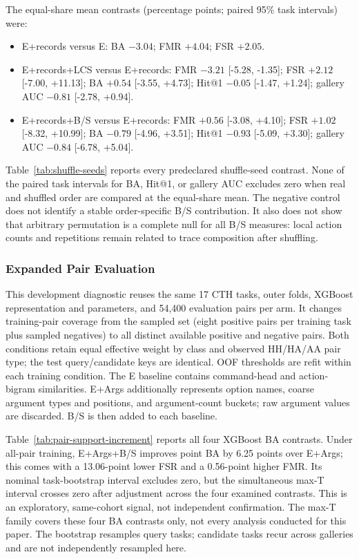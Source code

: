 \documentclass[10pt]{article}
\begin{document}
The equal-share mean contrasts (percentage points; paired 95\% task intervals) were:

\begin{itemize}
\item E+records versus E: BA $-3.04$; FMR $+4.04$; FSR $+2.05$.
\item E+records+LCS versus E+records: FMR $-3.21$ [-5.28, -1.35]; FSR $+2.12$ [-7.00, +11.13]; BA $+0.54$ [-3.55, +4.73]; Hit@1 $-0.05$ [-1.47, +1.24]; gallery AUC $-0.81$ [-2.78, +0.94].
\item E+records+B/S versus E+records: FMR $+0.56$ [-3.08, +4.10]; FSR $+1.02$ [-8.32, +10.99]; BA $-0.79$ [-4.96, +3.51]; Hit@1 $-0.93$ [-5.09, +3.30]; gallery AUC $-0.84$ [-6.78, +5.04].
\end{itemize}

Table~\ref{tab:shuffle-seeds} reports every predeclared shuffle-seed contrast. None of the paired task intervals for BA, Hit@1, or gallery AUC excludes zero when real and shuffled order are compared at the equal-share mean. The negative control does not identify a stable order-specific B/S contribution. It also does not show that arbitrary permutation is a complete null for all B/S measures: local action counts and repetitions remain related to trace composition after shuffling.

\subsubsection{Expanded Pair Evaluation}
\label{sec:pairsupport}
This development diagnostic reuses the same 17 CTH tasks, outer folds, XGBoost representation and parameters, and 54,400 evaluation pairs per arm. It changes training-pair coverage from the sampled set (eight positive pairs per training task plus sampled negatives) to all distinct available positive and negative pairs. Both conditions retain equal effective weight by class and observed HH/HA/AA pair type; the test query/candidate keys are identical. OOF thresholds are refit within each training condition. The E baseline contains command-head and action-bigram similarities. E+Args additionally represents option names, coarse argument types and positions, and argument-count buckets; raw argument values are discarded. B/S is then added to each baseline.

Table~\ref{tab:pair-support-increment} reports all four XGBoost BA contrasts. Under all-pair training, E+Args+B/S improves point BA by 6.25 points over E+Args; this comes with a 13.06-point lower FSR and a 0.56-point higher FMR. Its nominal task-bootstrap interval excludes zero, but the simultaneous max-T interval crosses zero after adjustment across the four examined contrasts. This is an exploratory, same-cohort signal, not independent confirmation. The max-T family covers these four BA contrasts only, not every analysis conducted for this paper. The bootstrap resamples query tasks; candidate tasks recur across galleries and are not independently resampled here.
\end{document}
